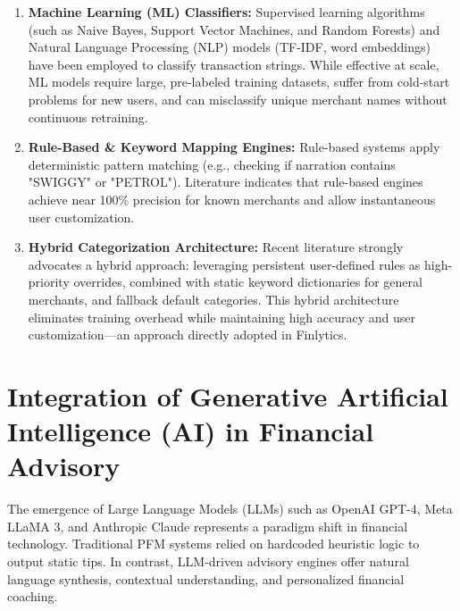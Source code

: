 \documentclass[../Project-Report-Main.tex]{subfiles}
\begin{document}
\begin{enumerate}
 \item \textbf{Machine Learning (ML) Classifiers:} Supervised learning algorithms (such as Naive Bayes, Support Vector Machines, and Random Forests) and Natural Language Processing (NLP) models (TF-IDF, word embeddings) have been employed to classify transaction strings. While effective at scale, ML models require large, pre-labeled training datasets, suffer from cold-start problems for new users, and can misclassify unique merchant names without continuous retraining.

 \item \textbf{Rule-Based \& Keyword Mapping Engines:} Rule-based systems apply deterministic pattern matching (e.g., checking if narration contains "SWIGGY" or "PETROL"). Literature indicates that rule-based engines achieve near 100\% precision for known merchants and allow instantaneous user customization.

 \item \textbf{Hybrid Categorization Architecture:} Recent literature strongly advocates a hybrid approach: leveraging persistent user-defined rules as high-priority overrides, combined with static keyword dictionaries for general merchants, and fallback default categories. This hybrid architecture eliminates training overhead while maintaining high accuracy and user customization—an approach directly adopted in Finlytics.
\end{enumerate}

\section{Integration of Generative Artificial Intelligence (AI) in Financial Advisory}

The emergence of Large Language Models (LLMs) such as OpenAI GPT-4, Meta LLaMA 3, and Anthropic Claude represents a paradigm shift in financial technology. Traditional PFM systems relied on hardcoded heuristic logic to output static tips. In contrast, LLM-driven advisory engines offer natural language synthesis, contextual understanding, and personalized financial coaching.
\end{document}

